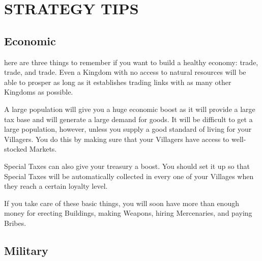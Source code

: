 
\chapter[Strategy Tips]{{\Huge S}TRATEGY {\Huge T}IPS}


\section{Economic}


here are three things to remember if you want to build a healthy economy: trade, trade, and trade. Even a Kingdom with no access to natural resources will be able to prosper as long as it establishes trading links with as many other Kingdoms as possible.

A large population will give you a huge economic boost as it will provide a large tax base and will generate a large demand for goods. It will be difficult to get a large population, however, unless you supply a good standard of living for your Villagers. You do this by making sure that your Villagers have access to well-stocked Markets.

Special Taxes can also give your treasury a boost. You should set it up so that Special Taxes will be automatically collected in every one of your Villages when they reach a certain loyalty level.

If you take care of these basic things, you will soon have more than enough money for erecting Buildings, making Weapons, hiring Mercenaries, and paying Bribes.

\section{Military}

